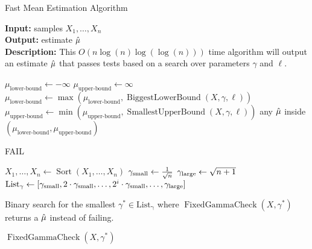 \begin{algorithm}[h]
    \caption{Fast Mean Estimation Algorithm} \label{algo:fast}
    \hspace*{\algorithmicindent} 
    \begin{flushleft}
      {\bf Input:} samples $X_1,\dots,X_n$ \\
      {\bf Output:} estimate $\hat{\mu}$\\
      {\bf Description:} This $O(n \log(n) \log(\log(n)))$ time algorithm will output an estimate $\hat{\mu}$ that passes tests based on a search over parameters $\gamma$ and $\ell$.
    \end{flushleft}
    \begin{algorithmic}[1]

     
        \State $\mu_{\textrm{lower-bound}} \gets -\infty$
        \State $\mu_{\textrm{upper-bound}} \gets \infty$
         
            \State $\mu_{\textrm{lower-bound}} \gets \max\left(\mu_{\textrm{lower-bound}},\operatorname{BiggestLowerBound}(X,\gamma,\ell) \right)$ 
            \State $\mu_{\textrm{upper-bound}} \gets \min\left(\mu_{\textrm{upper-bound}},\operatorname{SmallestUpperBound}(X,\gamma,\ell) \right)$ 
        \EndFor
            \Return any $\hat{\mu}$ inside $(\mu_{\textrm{lower-bound}},\mu_{\textrm{upper-bound}})$
        \Else 
            
            \Return FAIL 
        \EndIf
    \EndProcedure
    
        \State $X_1,\dots,X_n \gets \operatorname{Sort}(X_1,\dots,X_n)$ 
        \State $\gamma_{\textrm{small}} \gets \tfrac{1}{\sqrt{n}}$
        \State $\gamma_{\textrm{large}} \gets \sqrt{n+1}$
        \State $\operatorname{List_\gamma} \gets [\gamma_{\textrm{small}}, 2 \cdot \gamma_{\textrm{small}}, \dots, 2^i \cdot \gamma_{\textrm{small}}, \dots, \gamma_{\textrm{large}}]$ 

        \State Binary search for the smallest $\gamma^* \in \operatorname{List_\gamma}$ where $\operatorname{FixedGammaCheck}(X,\gamma^*)$ returns a $\hat{\mu}$ instead of failing. 

        \Return $\operatorname{FixedGammaCheck}(X,\gamma^*)$
    \EndProcedure
    \end{algorithmic}
\end{algorithm}

